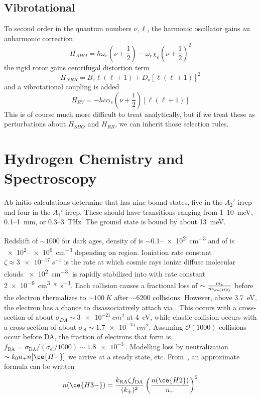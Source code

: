 \documentclass[12pt]{article}
\begin{document}
\subsection{Vibrotational}
To second order in the quantum numbers \( \nu, \ell \), the harmonic oscillator gains an anharmonic correction
\[ H_{AHO}=\hbar\omega_e \left(\nu+\frac{1}{2}\right)-\omega_e\chi_e\left( \nu+\frac{1}{2} \right)^2 \]
the rigid rotor gains centrifugal distortion term
\[ H_{NRR}=B_e\ell(\ell+1) +D_\nu[\ell(\ell+1)]^2\]
and a vibrotational coupling is added
\[ H_{RV}=-hc\alpha_e\left( \nu+\frac{1}{2} \right)[\ell(\ell+1)]\]
This is of course much more difficult to treat analytically, but if we treat these as perturbations about \( H_{SHO} \) and \( H_{RR} \), we can inherit those selection rules.


\section{Hydrogen Chemistry and Spectroscopy}
Ab initio calculations determine that  has nine bound states, five in the \(A_2'\) irrep and four in the \(A_1'\) irrep. These should have transitions ranging from 1--\SI{10}{meV}, 0.1--\SI{1}{mm}, or 0.3--\SI{3}{THz}. The ground state is bound by about \SI{13}{meV}.

Redshift of \(\sim 1000\) for dark ages, density of  is \(\sim\)0.1--\SI{e2}{cm^{-3}} and of  is \SI{e2}{}--\SI{e6}{cm^{-3}} depending on region.
Ioniation rate constant \(\zeta\approx\SI{3e-17}{s^{-1}}\) is the rate at which cosmic rays ionize diffuse molecular clouds \SI{e2}{cm^{-3}}.\@ {} is rapidly stabilized into  with rate constant \SI{2e-9}{cm^3*s^{-1}}. Each collision causes a fractional loss of \(\sim \frac{m_e}{m_{\ce{H2}}}\) before the electron thermalizes to \(\sim\SI{100}{K}\) after \(\sim6200\) collisions. However, above \SI{3.7}{eV}, the electron has a chance to disassociatively attach via . This occurs with a cross-section of about \(\sigma_{DA}\sim \SI{3e-21}{cm^2}\) at \SI{4}{eV}, while elastic collision occurs with a cross-section of about \(\sigma_\text{el}\sim\SI{1.7e-15}{cm^2}\). Assuming \(\mathscr O(1000)\) collisions occur before DA, the fraction of electrons that form  is \(f_\text{DA}=\sigma_\text{DA}/(\sigma_\text{el}/1000)\sim \SI{1.8e-3}{}\). Modelling loss by neutralization \(\sim k_0 n_+ n[\ce{H-}]\) we arrive at a steady state, etc. 
From~\cite{ayouz_formation_2011}, an approximate formula can be written
\begin{equation}
    n(\ce{H3-})=\frac{k_\text{RA}\zeta f_\text{DA}}{(k_\pm)^2}\left(\frac{n(\ce{H2})}{n_+}\right)^2
\end{equation}
\end{document}
